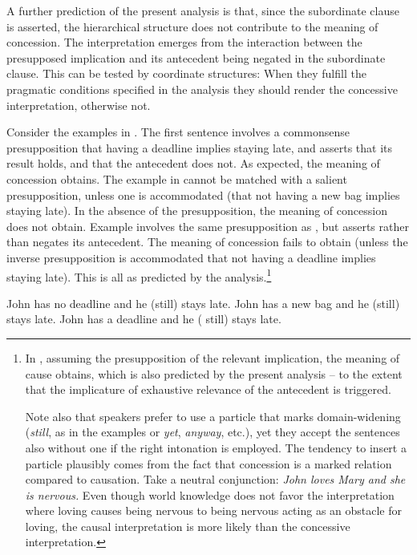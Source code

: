 \documentclass[output=paper,
colorlinks,
citecolor=brown,
newtxmath
]{langscibook}
\begin{document}
\noindent A further prediction of the present analysis is that, since the subordinate clause is asserted, the hierarchical structure does not contribute to the meaning of concession. The interpretation emerges from the interaction between the presupposed implication and its antecedent being negated in the subordinate clause. This can be tested by coordinate structures: When they fulfill the pragmatic conditions
specified in the analysis they should render the concessive interpretation, otherwise not.

Consider the examples in . The first sentence involves a commonsense presupposition that having a deadline implies staying late, and asserts that its result holds, and that the antecedent does not. As expected, the meaning of concession obtains. The example in  cannot be matched with a salient presupposition, unless one is accommodated (that not having a new bag implies staying late). In the absence of the presupposition, the meaning of concession does not obtain. Example  involves the same presupposition as , but asserts rather than negates its antecedent. The meaning of concession fails to obtain (unless the inverse presupposition is accommodated that not having a deadline implies staying late). This is all as predicted by the analysis.\footnote{In , assuming the presupposition of the relevant implication, the meaning of cause obtains, which is also predicted by the present analysis -- to the extent that the implicature of exhaustive relevance of the antecedent is triggered.

Note also that speakers prefer to use a particle that marks domain-widening (\textit{still}, as in the examples or \textit{yet}, \textit{anyway}, etc.), yet they accept the sentences also without one if the right intonation is employed. The tendency to insert a particle plausibly comes from the fact that concession is a marked relation compared to causation. Take a neutral conjunction: \textit{John loves Mary and she is nervous.} Even though world knowledge does not favor the interpretation where loving causes being nervous to being nervous acting as an obstacle for loving, the causal interpretation is more likely than the concessive interpretation.}

\ea\label{ex:ConcTest}
\ea John has no deadline and he (still) stays late.\label{ex:ConcTest-a}
\ex John has a new bag and he (still) stays late.\label{ex:ConcTest-b}
\ex John has a deadline and he (\minsp{\#} still) stays late.\label{ex:ConcTest-c}
\z\z
\end{document}
